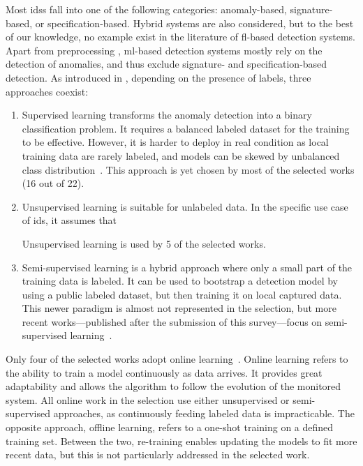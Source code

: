 Most \glspl{ids} fall into one of the following categories: anomaly-based, signature-based, or specification-based.
Hybrid systems are also considered, but to the best of our knowledge, no example exist in the literature of \gls{fl}-based detection systems.
Apart from preprocessing \cite{Kruegel2003}, \gls{ml}-based detection systems mostly rely on the detection of anomalies, and thus exclude signature- and specification-based detection.
As introduced in , depending on the presence of labels, three approaches coexist:
\begin{enumerate}[(1)]
    \item Supervised learning transforms the anomaly detection into a binary classification problem.
It requires a balanced labeled dataset for the training to be effective.
However, it is harder to deploy in real condition as local training data are rarely labeled, and models can be skewed by unbalanced class distribution~\cite{Campos2021}.
This approach is yet chosen by most of the selected works (16 out of 22).
    \item Unsupervised learning is suitable for unlabeled data.
In the specific use case of \gls{ids}, it assumes that
    Unsupervised learning is used by 5 of the selected works.
    \item Semi-supervised learning is a hybrid approach where only a small part of the training data is labeled.
It can be used to bootstrap a detection model by using a public labeled dataset, but then training it on local captured data.
This newer paradigm is almost not represented in the selection, but more recent works---published after the submission of this survey---focus on semi-supervised learning~\cite{Zhu2022,Aouedi2022}.

\end{enumerate}

Only four of the selected works adopt online learning~\cite{pahl_AllEyesYou_2018,nguyen_DIoTFederatedSelflearning_2019,schneble_Attackdetectionusing_2019,hei_trustedfeatureaggregator_2020}.
Online learning refers to the ability to train a model continuously as data arrives.
It provides great adaptability and allows the algorithm to follow the evolution of the monitored system.
All online work in the selection use either unsupervised or semi-supervised approaches, as continuously feeding labeled data is impracticable.
The opposite approach, offline learning, refers to a one-shot training on a defined training set.
Between the two, re-training enables updating the models to fit more recent data, but this is not particularly addressed in the selected work.

